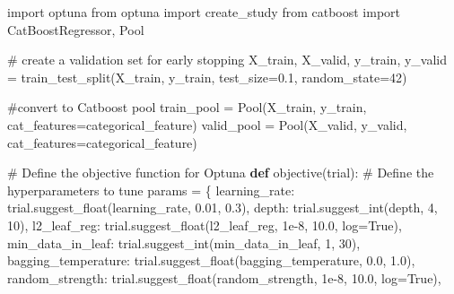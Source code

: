 \documentclass[
  letterpaper,
  DIV=11,
  numbers=noendperiod]{scrreprt}
\newenvironment{Shaded}{\begin{snugshade}}{\end{snugshade}}
\newcommand{\CommentTok}[1]{\textcolor[rgb]{0.37,0.37,0.37}{#1}}
\newcommand{\DecValTok}[1]{\textcolor[rgb]{0.68,0.00,0.00}{#1}}
\newcommand{\FloatTok}[1]{\textcolor[rgb]{0.68,0.00,0.00}{#1}}
\newcommand{\ImportTok}[1]{\textcolor[rgb]{0.00,0.46,0.62}{#1}}
\newcommand{\KeywordTok}[1]{\textcolor[rgb]{0.00,0.23,0.31}{\textbf{#1}}}
\newcommand{\NormalTok}[1]{\textcolor[rgb]{0.00,0.23,0.31}{#1}}
\newcommand{\OperatorTok}[1]{\textcolor[rgb]{0.37,0.37,0.37}{#1}}
\newcommand{\StringTok}[1]{\textcolor[rgb]{0.13,0.47,0.30}{#1}}
\newcommand{\VariableTok}[1]{\textcolor[rgb]{0.07,0.07,0.07}{#1}}
\begin{document}
\begin{Shaded}
\begin{Highlighting}[]
\ImportTok{import}\NormalTok{ optuna}
\ImportTok{from}\NormalTok{ optuna }\ImportTok{import}\NormalTok{ create\_study}
\ImportTok{from}\NormalTok{ catboost }\ImportTok{import}\NormalTok{ CatBoostRegressor, Pool}

\CommentTok{\# create a validation set for early stopping}
\NormalTok{X\_train, X\_valid, y\_train, y\_valid }\OperatorTok{=}\NormalTok{ train\_test\_split(X\_train, y\_train, test\_size}\OperatorTok{=}\FloatTok{0.1}\NormalTok{, random\_state}\OperatorTok{=}\DecValTok{42}\NormalTok{)}

\CommentTok{\#convert to Catboost pool}
\NormalTok{train\_pool }\OperatorTok{=}\NormalTok{ Pool(X\_train, y\_train, cat\_features}\OperatorTok{=}\NormalTok{categorical\_feature)}
\NormalTok{valid\_pool }\OperatorTok{=}\NormalTok{ Pool(X\_valid, y\_valid, cat\_features}\OperatorTok{=}\NormalTok{categorical\_feature)}

\CommentTok{\# Define the objective function for Optuna}
\KeywordTok{def}\NormalTok{ objective(trial):}
    \CommentTok{\# Define the hyperparameters to tune}
\NormalTok{    params }\OperatorTok{=}\NormalTok{ \{}
        \StringTok{\textquotesingle{}learning\_rate\textquotesingle{}}\NormalTok{: trial.suggest\_float(}\StringTok{\textquotesingle{}learning\_rate\textquotesingle{}}\NormalTok{, }\FloatTok{0.01}\NormalTok{, }\FloatTok{0.3}\NormalTok{),}
        \StringTok{\textquotesingle{}depth\textquotesingle{}}\NormalTok{: trial.suggest\_int(}\StringTok{\textquotesingle{}depth\textquotesingle{}}\NormalTok{, }\DecValTok{4}\NormalTok{, }\DecValTok{10}\NormalTok{),}
        \StringTok{\textquotesingle{}l2\_leaf\_reg\textquotesingle{}}\NormalTok{: trial.suggest\_float(}\StringTok{\textquotesingle{}l2\_leaf\_reg\textquotesingle{}}\NormalTok{, }\FloatTok{1e{-}8}\NormalTok{, }\FloatTok{10.0}\NormalTok{, log}\OperatorTok{=}\VariableTok{True}\NormalTok{),}
        \StringTok{\textquotesingle{}min\_data\_in\_leaf\textquotesingle{}}\NormalTok{: trial.suggest\_int(}\StringTok{\textquotesingle{}min\_data\_in\_leaf\textquotesingle{}}\NormalTok{, }\DecValTok{1}\NormalTok{, }\DecValTok{30}\NormalTok{),}
        \StringTok{\textquotesingle{}bagging\_temperature\textquotesingle{}}\NormalTok{: trial.suggest\_float(}\StringTok{\textquotesingle{}bagging\_temperature\textquotesingle{}}\NormalTok{, }\FloatTok{0.0}\NormalTok{, }\FloatTok{1.0}\NormalTok{),}
        \StringTok{\textquotesingle{}random\_strength\textquotesingle{}}\NormalTok{: trial.suggest\_float(}\StringTok{\textquotesingle{}random\_strength\textquotesingle{}}\NormalTok{, }\FloatTok{1e{-}8}\NormalTok{, }\FloatTok{10.0}\NormalTok{, log}\OperatorTok{=}\VariableTok{True}\NormalTok{),}


\end{Highlighting}
\end{Shaded}
\end{document}
